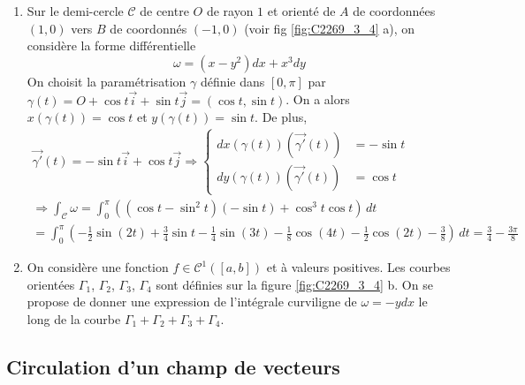 \begin{exples}
 \begin{enumerate}
 \item Sur le  demi-cercle $\mathcal C$ de centre $O$ de rayon $1$ et orienté de $A$ de coordonnées $(1,0)$ vers $B$ de coordonnés $(-1,0)$ (voir fig \ref{fig:C2269_3_4} a), on considère la forme différentielle 
\begin{displaymath}
 \omega = (x-y^2)dx + x^3dy
\end{displaymath}
On choisit la paramétrisation $\gamma$ définie dans $[0,\pi]$ par $\gamma(t)=O+\cos t \overrightarrow i + \sin t \overrightarrow j = (\cos t, \sin t)$. On a alors $x(\gamma(t))=\cos t$ et $y(\gamma(t))=\sin t$. De plus,
\begin{multline*}
 \overrightarrow{\gamma'}(t)=-\sin t \overrightarrow i + \cos t \overrightarrow j
\Rightarrow
\left\lbrace 
\begin{aligned}
 dx(\gamma(t))(\overrightarrow{\gamma'}(t)) &=  -\sin t \\
 dy(\gamma(t))(\overrightarrow{\gamma'}(t)) &=  \cos t 
\end{aligned}
\right. \\
\Rightarrow
\int_\mathcal C \omega =
\int_0^\pi\left( (\cos t - \sin^2 t)(-\sin t)+\cos^3t\cos t\right)\,dt \\
=\int_0^\pi
\left(-\frac{1}{2}\sin(2t)+\frac{3}{4}\sin t -\frac{1}{4}\sin(3t)
      -\frac{1}{8}\cos(4t) -\frac{1}{2}\cos(2t)-\frac{3}{8}
\right)\,dt 
=\frac{3}{4}-\frac{3\pi}{8}
\end{multline*}

\item 
On considère une fonction $f\in \mathcal C^1([a,b])$ et à valeurs positives. Les courbes orientées $\Gamma_1$, $\Gamma_2$, $\Gamma_3$, $\Gamma_4$ sont définies sur la figure \ref{fig:C2269_3_4} b. On se propose de donner une expression de l'intégrale curviligne de $\omega=-ydx$ le long de la courbe $\Gamma_1+\Gamma_2+\Gamma_3+\Gamma_4$.
\end{enumerate}
\end{exples}

\subsection{Circulation d'un champ de vecteurs}

